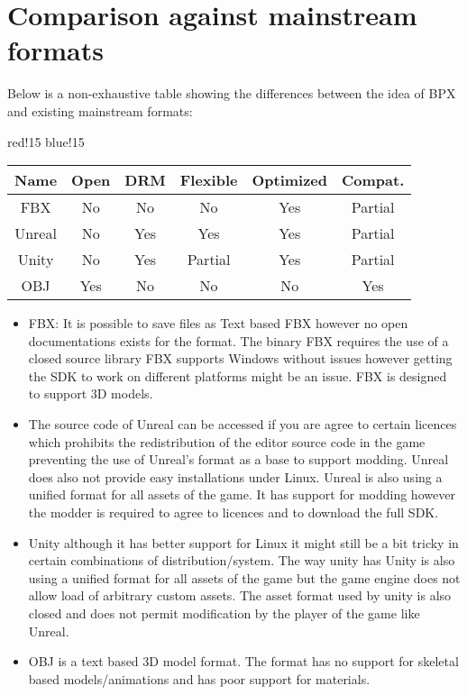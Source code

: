 \section{Comparison against mainstream formats}
Below is a non-exhaustive table showing the differences between the idea of BPX and existing mainstream formats:
\begin{center}
    {
        {red!15}
        {blue!15}
        \begin{tabular}{|c|c|c|c|c|c|}
            \hline
            \textbf{Name} & \textbf{Open} & \textbf{DRM} & \textbf{Flexible} & \textbf{Optimized} & \textbf{Compat.} \\
    
            \hline\hline
            FBX & \cellcolor{red}No & \cellcolor{green}No & \cellcolor{red}No & \cellcolor{green}Yes & \cellcolor{yellow}Partial \\
            Unreal & \cellcolor{red}No & \cellcolor{red}Yes & \cellcolor{green}Yes & \cellcolor{green}Yes & \cellcolor{yellow}Partial \\
            Unity & \cellcolor{red}No & \cellcolor{red}Yes & \cellcolor{yellow}Partial & \cellcolor{green}Yes & \cellcolor{yellow}Partial \\
            OBJ & \cellcolor{green}Yes & \cellcolor{green}No & \cellcolor{red}No & \cellcolor{red}No & \cellcolor{green}Yes \\
            \hline
        \end{tabular}
    }
\end{center}
\begin{itemize}
    \item FBX: It is possible to save files as Text based FBX however no open documentations exists for the format. The binary FBX requires the use of a closed source library FBX supports Windows without issues however getting the SDK to work on different platforms might be an issue.\newline
    FBX is designed to support 3D models.
    \item The source code of Unreal can be accessed if you are agree to certain licences which prohibits the redistribution of the editor source code in the game preventing the use of Unreal's format as a base to support modding. Unreal does also not provide easy installations under Linux.\newline
    Unreal is also using a unified format for all assets of the game. It has support for modding however the modder is required to agree to licences and to download the full SDK.
    \item Unity although it has better support for Linux it might still be a bit tricky in certain combinations of distribution/system. The way unity has\newline
    Unity is also using a unified format for all assets of the game but the game engine does not allow load of arbitrary custom assets. The asset format used by unity is also closed and does not permit modification by the player of the game like Unreal.
    \item OBJ is a text based 3D model format. The format has no support for skeletal based models/animations and has poor support for materials.
\end{itemize}